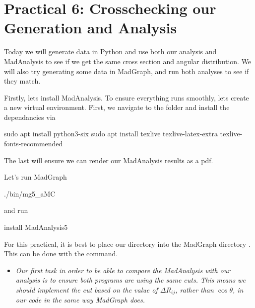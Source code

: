 \section*{Practical 6: Crosschecking our Generation and Analysis}

Today we will generate data in Python and use both our analysis and MadAnalysis to see if we get the same cross section and angular distribution. We will also try generating some data in MadGraph, and run both analyses to see if they match.

Firstly, lets install MadAnalysis. To ensure everything runs smoothly, lets create a new virtual environment. First, we navigate to the  folder and install
 the dependancies via
 \begin{codeenv}
     sudo apt install python3-six
     sudo apt install texlive texlive-latex-extra texlive-fonts-recommended
 \end{codeenv}
 The last will ensure we can render our MadAnalysis results as a pdf.

Let's run MadGraph
\begin{codeenv}
    ./bin/mg5_aMC
\end{codeenv}
and run
\begin{codeenv}
    install MadAnalysis5 
\end{codeenv}

For this practical, it is best to place our directory  into the MadGraph directory . This can be done with the  command.

\begin{itemize}
    \item \textit{Our first task in order to be able to compare the MadAnalysis with our analysis is to ensure both programs are using the same cuts. This means we should implement the cut based on the value of $\Delta R_{ij}$, rather than $\cos\theta$, in our code in the same way MadGraph does.}
\end{itemize}

